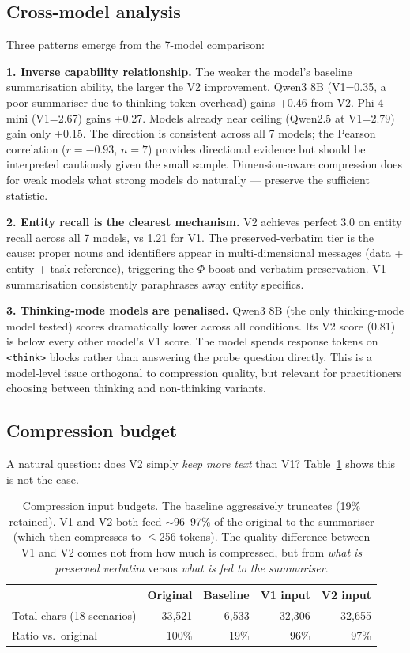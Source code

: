 \documentclass[11pt,a4paper]{article}
\begin{document}
\subsection{Cross-model analysis}

Three patterns emerge from the 7-model comparison:

\textbf{1. Inverse capability relationship.} The weaker the model's baseline summarisation ability, the larger the V2 improvement. Qwen3 8B (V1=0.35, a poor summariser due to thinking-token overhead) gains +0.46 from V2. Phi-4 mini (V1=2.67) gains +0.27. Models already near ceiling (Qwen2.5 at V1=2.79) gain only +0.15. The direction is consistent across all 7 models; the Pearson correlation ($r = -0.93$, $n=7$) provides directional evidence but should be interpreted cautiously given the small sample. Dimension-aware compression does for weak models what strong models do naturally --- preserve the sufficient statistic.

\textbf{2. Entity recall is the clearest mechanism.} V2 achieves perfect 3.0 on entity recall across all 7 models, vs 1.21 for V1. The preserved-verbatim tier is the cause: proper nouns and identifiers appear in multi-dimensional messages (data + entity + task-reference), triggering the $\Phi$ boost and verbatim preservation. V1 summarisation consistently paraphrases away entity specifics.

\textbf{3. Thinking-mode models are penalised.} Qwen3 8B (the only thinking-mode model tested) scores dramatically lower across all conditions. Its V2 score (0.81) is below every other model's V1 score. The model spends response tokens on \texttt{<think>} blocks rather than answering the probe question directly. This is a model-level issue orthogonal to compression quality, but relevant for practitioners choosing between thinking and non-thinking variants.

\subsection{Compression budget}

A natural question: does V2 simply \emph{keep more text} than V1? Table~\ref{tab:compression} shows this is not the case.

\begin{table}[H]
\centering
\begin{tabular}{@{}lrrrr@{}}
\toprule
& \textbf{Original} & \textbf{Baseline} & \textbf{V1 input} & \textbf{V2 input} \\
\midrule
Total chars (18 scenarios) & 33{,}521 & 6{,}533 & 32{,}306 & 32{,}655 \\
Ratio vs.\ original & 100\% & 19\% & 96\% & 97\% \\
\bottomrule
\end{tabular}
\caption{Compression input budgets. The baseline aggressively truncates (19\% retained). V1 and V2 both feed $\sim$96--97\% of the original to the summariser (which then compresses to $\leq$256 tokens). The quality difference between V1 and V2 comes not from how much is compressed, but from \emph{what is preserved verbatim} versus \emph{what is fed to the summariser}.}
\label{tab:compression}
\end{table}
\end{document}
